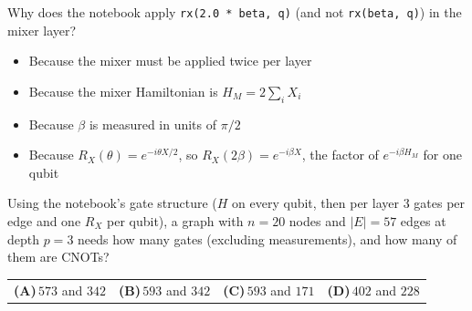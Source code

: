 \documentclass[11pt,a4paper]{article}
\newcommand{\optlabel}[1]{\textbf{(#1)}}
\newenvironment{qitem}[1]{\begin{list}{}{\setlength{\leftmargin}{3.3em}\setlength{\labelwidth}{3.1em}%
  \setlength{\labelsep}{0.2em}\setlength{\topsep}{3pt}\setlength{\parsep}{3pt}}\item[\textbf{Q.#1}\hfill]}{\end{list}}
\newcommand{\qsep}{\par\vspace{2pt}{\color{black!15}\hrule}\vspace{4pt}}
\begin{document}
\begin{qitem}{44}
Why does the notebook apply \texttt{rx(2.0 * beta, q)} (and not \texttt{rx(beta, q)}) in the mixer layer?
\begin{itemize}[leftmargin=2.6em, labelsep=0.4em, itemsep=2pt, topsep=3pt]
\item[\optlabel{A}] Because the mixer must be applied twice per layer
\item[\optlabel{B}] Because the mixer Hamiltonian is $H_M = 2\sum_i X_i$
\item[\optlabel{C}] Because $\beta$ is measured in units of $\pi/2$
\item[\optlabel{D}] Because $R_X(\theta) = e^{-i\theta X/2}$, so $R_X(2\beta) = e^{-i\beta X}$, the factor of $e^{-i\beta H_M}$ for one qubit
\end{itemize}
\end{qitem}
\qsep

\begin{qitem}{45}
Using the notebook's gate structure ($H$ on every qubit, then per layer 3 gates per edge and one $R_X$ per qubit), a
graph with $n = 20$ nodes and $|E| = 57$ edges at depth $p = 3$ needs how many gates (excluding measurements), and how many of
them are CNOTs?
\par\smallskip\noindent\begin{tabularx}{\linewidth}{@{}*{4}{L}@{}}
\optlabel{A}\,$573$ and $342$ & \optlabel{B}\,$593$ and $342$ & \optlabel{C}\,$593$ and $171$ & \optlabel{D}\,$402$ and $228$
\end{tabularx}
\end{qitem}
\qsep
\end{document}
